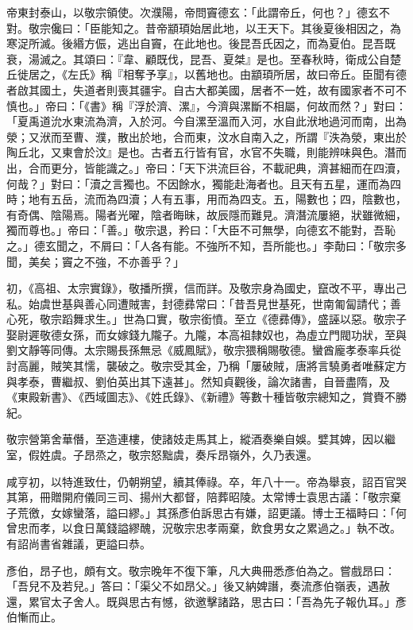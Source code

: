 \begin{pinyinscope}
 帝東封泰山，以敬宗領使。次濮陽，帝問竇德玄：「此謂帝丘，何也？」德玄不對。敬宗儳曰：「臣能知之。昔帝顓頊始居此地，以王天下。其後夏後相因之，為寒浞所滅。後緡方侲，逃出自竇，在此地也。後昆吾氏因之，而為夏伯。昆吾既衰，湯滅之。其頌曰：『韋、顧既伐，昆吾、夏桀』是也。至春秋時，衛成公自楚丘徙居之，《左氏》稱『相奪予享』，以舊地也。由顓頊所居，故曰帝丘。臣聞有德者啟其國土，失道者則喪其疆宇。自古大都美國，居者不一姓，故有國家者不可不慎也。」帝曰：「《書》稱『浮於濟、漯』，今濟與漯斷不相屬，何故而然？」對曰：「夏禹道沇水東流為濟，入於河。今自漯至溫而入河，水自此洑地過河而南，出為滎；又洑而至曹、濮，散出於地，合而東，汶水自南入之，所謂『泆為滎，東出於陶丘北，又東會於汶』是也。古者五行皆有官，水官不失職，則能辨味與色。潛而出，合而更分，皆能識之。」帝曰：「天下洪流巨谷，不載祀典，濟甚細而在四瀆，何哉？」對曰：「瀆之言獨也。不因餘水，獨能赴海者也。且天有五星，運而為四時；地有五岳，流而為四瀆；人有五事，用而為四支。五，陽數也；四，陰數也，有奇偶、陰陽焉。陽者光曜，陰者晦昧，故辰隱而難見。濟潛流屢絕，狀雖微細，獨而尊也。」帝曰：「善。」敬宗退，矜曰：「大臣不可無學，向德玄不能對，吾恥之。」德玄聞之，不屑曰：「人各有能。不強所不知，吾所能也。」李勣曰：「敬宗多聞，美矣；竇之不強，不亦善乎？」



 初，《高祖、太宗實錄》，敬播所撰，信而詳。及敬宗身為國史，竄改不平，專出己私。始虞世基與善心同遭賊害，封德彞常曰：「昔吾見世基死，世南匍匐請代；善心死，敬宗蹈舞求生。」世為口實，敬宗銜憤。至立《德彞傳》，盛誣以惡。敬宗子娶尉遲敬德女孫，而女嫁錢九隴子。九隴，本高祖隸奴也，為虛立門閥功狀，至與劉文靜等同傳。太宗賜長孫無忌《威鳳賦》，敬宗猥稱賜敬德。蠻酋龐孝泰率兵從討高麗，賊笑其懦，襲破之。敬宗受其金，乃稱「屢破賊，唐將言驍勇者唯蘇定方與孝泰，曹繼叔、劉伯英出其下遠甚」。然知貞觀後，論次諸書，自晉盡隋，及《東殿新書》、《西域圖志》、《姓氏錄》、《新禮》等數十種皆敬宗總知之，賞賚不勝紀。



 敬宗營第舍華僭，至造連樓，使諸妓走馬其上，縱酒奏樂自娛。嬖其婢，因以繼室，假姓虞。子昂烝之，敬宗怒黜虞，奏斥昂嶺外，久乃表還。



 咸亨初，以特進致仕，仍朝朔望，續其俸祿。卒，年八十一。帝為舉哀，詔百官哭其第，冊贈開府儀同三司、揚州大都督，陪葬昭陵。太常博士袁思古議：「敬宗棄子荒徼，女嫁蠻落，謚曰繆。」其孫彥伯訴思古有嫌，詔更議。博士王福畤曰：「何曾忠而孝，以食日萬錢謚繆醜，況敬宗忠孝兩棄，飲食男女之累過之。」執不改。有詔尚書省雜議，更謚曰恭。



 彥伯，昂子也，頗有文。敬宗晚年不復下筆，凡大典冊悉彥伯為之。嘗戲昂曰：「吾兒不及若兒。」答曰：「渠父不如昂父。」後又納婢譖，奏流彥伯嶺表，遇赦還，累官太子舍人。既與思古有憾，欲邀擊諸路，思古曰：「吾為先子報仇耳。」彥伯慚而止。




\end{pinyinscope}

